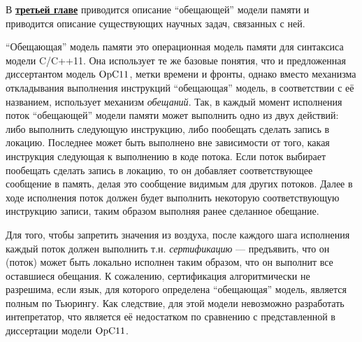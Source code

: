 
В \underline{\textbf{третьей главе}} приводится описание ``обещающей'' модели памяти и приводится
описание существующих научных задач, связанных с ней.

``Обещающая'' модель памяти это операционная модель памяти для синтаксиса модели C/C++11.
Она использует те же базовые понятия, что и предложенная диссертантом модель $\mathrm{OpC11}$,
метки времени и фронты, однако вместо механизма откладывания выполнения инструкций ``обещающая'' модель,
в соответствии с её названием, использует механизм \emph{обещаний}. Так, в каждый момент исполнения поток
``обещающей'' модели памяти может выполнить одно из двух действий: либо выполнить следующую инструкцию,
либо пообещать сделать запись в локацию. Последнее может быть выполнено вне зависимости от того, какая
инструкция следующая к выполнению в коде потока.
Если поток выбирает пообещать сделать запись в локацию, то он добавляет соответствующее сообщение в память,
делая это сообщение видимым для других потоков. Далее в ходе исполнения поток должен будет выполнить некоторую
соответствующую инструкцию записи, таким образом выполняя ранее сделанное обещание.

Для того, чтобы запретить значения из воздуха, после каждого шага исполнения каждый поток должен выполнить
т.н. \emph{сертификацию} --- предъявить, что он (поток) может быть локально исполнен таким образом, что
он выполнит все оставшиеся обещания. К сожалению, сертификация алгоритмически не разрешима, если
язык, для которого определена ``обещающая'' модель, является полным по Тьюрингу. Как следствие, для
этой модели невозможно разработать интепретатор, что является её недостатком по сравнению с представленной в
диссертации модели $\mathrm{OpC11}$.

